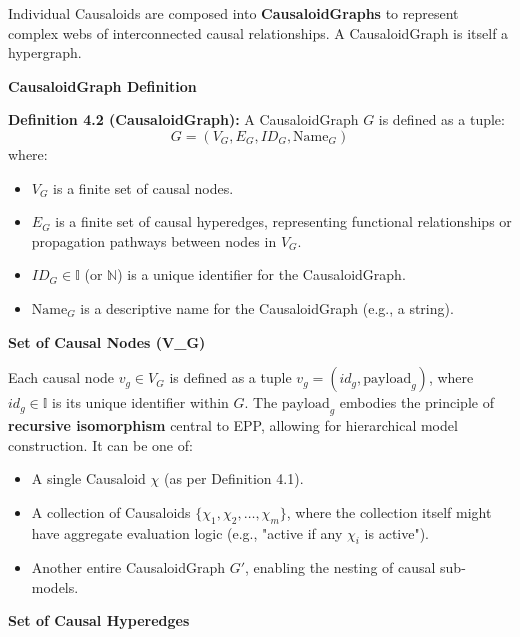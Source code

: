     Individual Causaloids are composed into \textbf{CausaloidGraphs} to represent complex webs of interconnected causal relationships. A CausaloidGraph is itself a hypergraph.

    
\textbf{CausaloidGraph Definition}
        
        \textbf{Definition 4.2 (CausaloidGraph):} A CausaloidGraph \( G \) is defined as a tuple:
        \[ G = (V_G, E_G, ID_G, \text{Name}_G) \]
        where:
        \begin{itemize}
            \item \( V_G \) is a finite set of causal nodes.
            \item \( E_G \) is a finite set of causal hyperedges, representing functional relationships or propagation pathways between nodes in \(V_G\).
            \item \( ID_G \in \mathbb{I} \) (or \(\mathbb{N}\)) is a unique identifier for the CausaloidGraph.
            \item \( \text{Name}_G \) is a descriptive name for the CausaloidGraph (e.g., a string).
        \end{itemize}

        
\textbf{Set of Causal Nodes (V\_G)}
        
        Each causal node \( v_g \in V_G \) is defined as a tuple \(v_g = (id_g, \text{payload}_g)\), where \(id_g \in \mathbb{I}\) is its unique identifier within \(G\).
        The \( \text{payload}_g \) embodies the principle of \textbf{recursive isomorphism} central to EPP, allowing for hierarchical model construction. It can be one of:
        \begin{itemize}
            \item A single Causaloid \(\chi\) (as per Definition 4.1).
            \item A collection of Causaloids \(\{\chi_1, \chi_2, \dots, \chi_m\}\), where the collection itself might have aggregate evaluation logic (e.g., "active if any \(\chi_i\) is active").
            \item Another entire CausaloidGraph \(G'\), enabling the nesting of causal sub-models.
        \end{itemize}


\textbf{Set of Causal Hyperedges}
        
